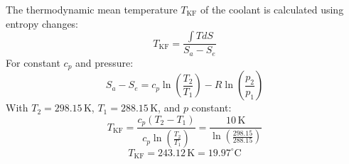The thermodynamic mean temperature \( T_{\text{KF}} \) of the coolant is calculated using entropy changes:  
\[
T_{\text{KF}} = \frac{\int T dS}{S_a - S_e}
\]  
For constant \( c_p \) and pressure:  
\[
S_a - S_e = c_p \ln \left( \frac{T_2}{T_1} \right) - R \ln \left( \frac{p_2}{p_1} \right)
\]  
With \( T_2 = 298.15 \, \text{K} \), \( T_1 = 288.15 \, \text{K} \), and \( p \) constant:  
\[
T_{\text{KF}} = \frac{c_p (T_2 - T_1)}{c_p \ln \left( \frac{T_2}{T_1} \right)} = \frac{10 \, \text{K}}{\ln \left( \frac{298.15}{288.15} \right)}
\]  
\[
T_{\text{KF}} = 243.12 \, \text{K} = 19.97^\circ\text{C}
\]